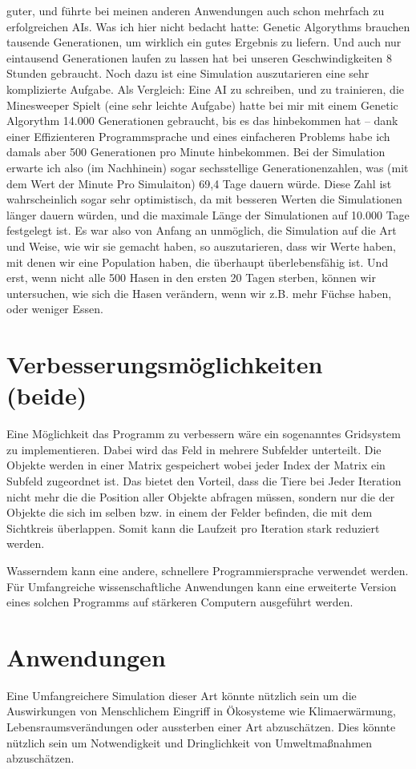 \documentclass[12pt]{article}
\begin{document}
guter, und führte bei meinen anderen Anwendungen auch schon mehrfach zu
erfolgreichen AIs. Was ich hier nicht bedacht hatte: Genetic Algorythms brauchen
tausende Generationen, um wirklich ein gutes Ergebnis zu liefern. Und auch nur
eintausend Generationen laufen zu lassen hat bei unseren Geschwindigkeiten 8 Stunden
gebraucht. Noch dazu ist eine Simulation auszutarieren eine sehr komplizierte Aufgabe.
Als Vergleich: Eine AI zu schreiben, und zu trainieren, die Minesweeper Spielt (eine
sehr leichte Aufgabe) hatte bei mir mit einem Genetic Algorythm 14.000 Generationen
gebraucht, bis es das hinbekommen hat – dank einer Effizienteren Programmsprache und
eines einfacheren Problems habe ich damals aber 500 Generationen pro Minute
hinbekommen. Bei der Simulation erwarte ich also (im Nachhinein) sogar sechsstellige
Generationenzahlen, was (mit dem Wert der Minute Pro Simulaiton) 69,4 Tage dauern
würde. Diese Zahl ist wahrscheinlich sogar sehr optimistisch, da mit besseren Werten die
Simulationen länger dauern würden, und die maximale Länge der Simulationen auf
10.000 Tage festgelegt ist. Es war also von Anfang an unmöglich, die Simulation auf die
Art und Weise, wie wir sie gemacht haben, so auszutarieren, dass wir Werte haben, mit
denen wir eine Population haben, die überhaupt überlebensfähig ist. Und erst, wenn
nicht alle 500 Hasen in den ersten 20 Tagen sterben, können wir untersuchen, wie sich
die Hasen verändern, wenn wir z.B. mehr Füchse haben, oder weniger Essen.


\section{Verbesserungsmöglichkeiten (beide)}
Eine Möglichkeit das Programm zu verbessern wäre ein sogenanntes Gridsystem zu implementieren.
Dabei wird das Feld in mehrere Subfelder unterteilt.
Die Objekte werden in einer Matrix gespeichert wobei jeder Index der Matrix ein Subfeld zugeordnet ist.
Das bietet den Vorteil, dass die Tiere bei Jeder Iteration nicht mehr die die
Position aller Objekte abfragen müssen, sondern nur die der Objekte die sich im
selben bzw. in einem der Felder befinden, die mit dem Sichtkreis überlappen.
Somit kann die Laufzeit pro Iteration stark reduziert werden.

Wasserndem kann eine andere, schnellere Programmiersprache verwendet werden.
Für Umfangreiche wissenschaftliche Anwendungen kann eine erweiterte Version
eines solchen Programms auf stärkeren Computern ausgeführt werden.
\section{Anwendungen}
Eine Umfangreichere Simulation dieser Art könnte nützlich sein um die Auswirkungen von Menschlichem Eingriff in Ökosysteme wie Klimaerwärmung, Lebensraumsverändungen oder aussterben einer Art abzuschätzen.
Dies könnte nützlich sein um Notwendigkeit und Dringlichkeit von Umweltmaßnahmen abzuschätzen.
\end{document}
